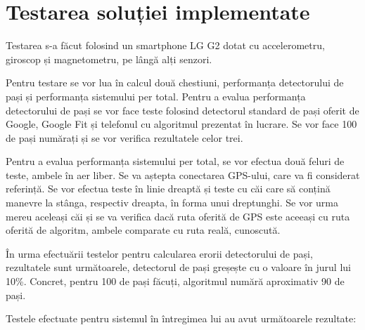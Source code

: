 \documentclass[12pt, a4paper, oneside]{article}
\begin{document}
\newpage
\section{Testarea soluției implementate} \label{TestareAplicatie}
Testarea s-a făcut folosind un smartphone LG G2 dotat cu accelerometru, giroscop și magnetometru, pe lângă alți senzori.

Pentru testare se vor lua în calcul două chestiuni, performanța detectorului de pași și performanța sistemului per total. Pentru a evalua performanța detectorului de pași se vor face teste folosind detectorul standard de pași oferit de Google, Google Fit și telefonul cu algoritmul prezentat în lucrare. Se vor face 100 de pași numărați și se vor verifica rezultatele celor trei.

Pentru a evalua performanța sistemului per total, se vor efectua două feluri de teste, ambele în aer liber. Se va aștepta conectarea GPS-ului, care va fi considerat referință. Se vor efectua teste în linie dreaptă și teste cu căi care să conțină manevre la stânga, respectiv dreapta, în forma unui dreptunghi. Se vor urma mereu aceleași căi și se va verifica dacă ruta oferită de GPS este aceeași cu ruta oferită de algoritm, ambele comparate cu ruta reală, cunoscută.

În urma efectuării testelor pentru calcularea erorii detectorului de pași, rezultatele sunt următoarele, detectorul de pași greșește cu o valoare în jurul lui 10\%. Concret, pentru 100 de pași făcuți, algoritmul numără aproximativ 90 de pași.

Testele efectuate pentru sistemul în întregimea lui au avut următoarele rezultate:
\end{document}
